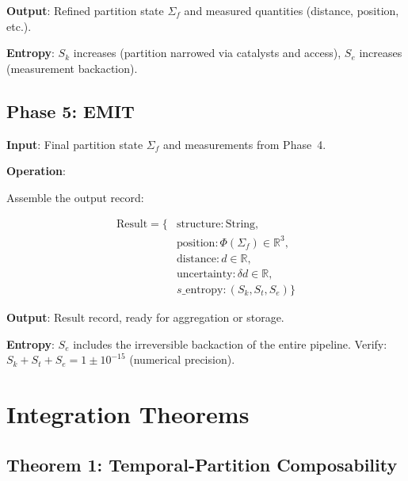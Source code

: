\documentclass[11pt,twocolumn]{article}
\begin{document}
\textbf{Output}: Refined partition state $\Sigma_f$ and measured quantities (distance, position, etc.).

\textbf{Entropy}: $S_k$ increases (partition narrowed via catalysts and access), $S_e$ increases (measurement backaction).

\subsection{Phase 5: EMIT}

\textbf{Input}: Final partition state $\Sigma_f$ and measurements from Phase~4.

\textbf{Operation}:

Assemble the output record:

\begin{align}
\text{Result} = \{
  &\text{structure} : \text{String}, \\
  &\text{position} : \Phi(\Sigma_f) \in \mathbb{R}^3, \\
  &\text{distance} : d \in \mathbb{R}, \\
  &\text{uncertainty} : \delta d \in \mathbb{R}, \\
  &s\_\text{entropy} : (S_k, S_t, S_e)
\}
\end{align}

\textbf{Output}: Result record, ready for aggregation or storage.

\textbf{Entropy}: $S_e$ includes the irreversible backaction of the entire pipeline. Verify: $S_k + S_t + S_e = 1 \pm 10^{-15}$ (numerical precision).

\section{Integration Theorems}
\label{sec:theorems}

\subsection{Theorem 1: Temporal-Partition Composability}
\end{document}
